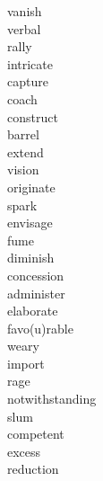 \documentclass[b5paper, 11pt]{ctexart}
\begin{document}
\begin{multicols*}{3}
\begin{description}
\item[vanish]

\item[verbal]

\item[rally]

\item[intricate]

\item[capture]

\item[coach]

\item[construct]

\item[barrel]

\item[extend]

\item[vision]

\item[originate]

\item[spark]

\item[envisage]

\item[fume]

\item[diminish]

\item[concession]

\item[administer]

\item[elaborate]

\item[favo(u)rable]

\item[weary]

\item[import]

\item[rage]

\item[notwithstanding]

\item[slum]

\item[competent]

\item[excess]

\item[reduction]


\end{description}
\end{multicols*}
\end{document}

